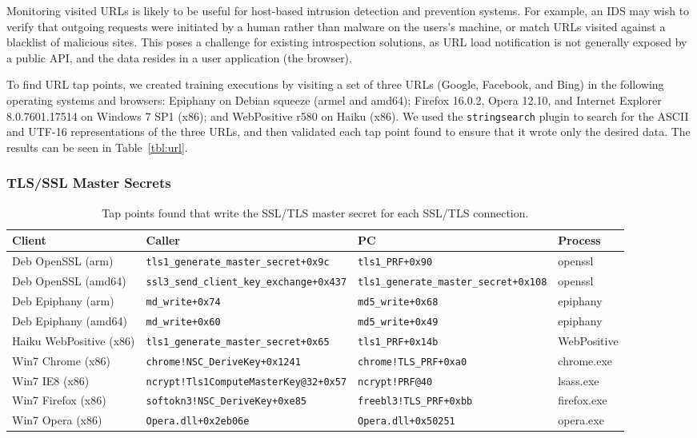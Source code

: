 Monitoring visited URLs is likely to be useful for host-based intrusion
detection and prevention systems. For example, an IDS may wish to verify
that outgoing requests were initiated by a human rather than malware on
the users's machine, or match URLs visited against a blacklist of
malicious sites. This poses a challenge for existing introspection
solutions, as URL load notification is not generally exposed by a public
API, and the data resides in a user application (the browser).

To find URL tap points, we created training executions by visiting a set
of three URLs (Google, Facebook, and Bing) in the following operating
systems and browsers: Epiphany on Debian squeeze (armel and amd64);
Firefox 16.0.2, Opera 12.10, and Internet Explorer 8.0.7601.17514 on
Windows 7 SP1 (x86); and WebPositive r580 on Haiku (x86). We used the
\texttt{stringsearch} plugin to search for the ASCII and UTF-16
representations of the three URLs, and then validated each tap point
found to ensure that it wrote only the desired data. The results can be
seen in Table~\ref{tbl:url}.

\subsubsection{TLS/SSL Master Secrets}
\label{sec:eval:subsec:ssl}

\begin{table*}
    \centering
    \small
    \begin{tabular}{|l|l|l|l|}
        \hline
        Client & Caller & PC & Process \\
        \hline
        Deb OpenSSL (arm) & \texttt{tls1\_generate\_master\_secret+0x9c} & \texttt{tls1\_PRF+0x90} & openssl \\
        Deb OpenSSL (amd64) & \texttt{ssl3\_send\_client\_key\_exchange+0x437} & \texttt{tls1\_generate\_master\_secret+0x108} & openssl \\
        Deb Epiphany (arm) & \texttt{md\_write+0x74} & \texttt{md5\_write+0x68} & epiphany \\ 
        Deb Epiphany (amd64) & \texttt{md\_write+0x60} & \texttt{md5\_write+0x49} & epiphany \\ 
        Haiku WebPositive (x86) & \texttt{tls1\_generate\_master\_secret+0x65} & \texttt{tls1\_PRF+0x14b} & WebPositive \\
        Win7 Chrome (x86) & \texttt{chrome!NSC\_DeriveKey+0x1241} & \texttt{chrome!TLS\_PRF+0xa0} & chrome.exe \\
        Win7 IE8 (x86) & \texttt{ncrypt!Tls1ComputeMasterKey@32+0x57} & \texttt{ncrypt!PRF@40} & lsass.exe \\
        Win7 Firefox (x86) & \texttt{softokn3!NSC\_DeriveKey+0xe85} & \texttt{freebl3!TLS\_PRF+0xbb} & firefox.exe \\
        Win7 Opera (x86) & \texttt{Opera.dll+0x2eb06e} & \texttt{Opera.dll+0x50251} & opera.exe \\
        \hline
    \end{tabular}
\caption{Tap points found that write the SSL/TLS master secret for each
SSL/TLS connection.}
\label{tbl:ssl}
\end{table*}

